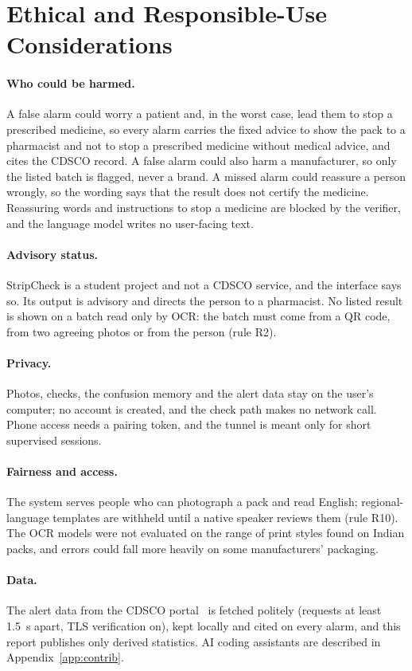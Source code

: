 \section{Ethical and Responsible-Use Considerations}
\label{sec:lim-ethical-and-responsible-use-considerations}

\paragraph{Who could be harmed.} A false alarm could worry a patient and, in the worst case, lead them to stop a prescribed medicine, so every alarm carries the fixed advice to show the pack to a pharmacist and not to stop a prescribed medicine without medical advice, and cites the CDSCO record. A false alarm could also harm a manufacturer, so only the listed batch is flagged, never a brand. A missed alarm could reassure a person wrongly, so the \NLISTED{} wording says that the result does not certify the medicine. Reassuring words and instructions to stop a medicine are blocked by the verifier, and the language model writes no user-facing text.

\paragraph{Advisory status.} StripCheck is a student project and not a CDSCO service, and the interface says so. Its output is advisory and directs the person to a pharmacist. No listed result is shown on a batch read only by OCR: the batch must come from a QR code, from two agreeing photos or from the person (rule R2).

\paragraph{Privacy.} Photos, checks, the confusion memory and the alert data stay on the user's computer; no account is created, and the check path makes no network call. Phone access needs a pairing token, and the tunnel is meant only for short supervised sessions.

\paragraph{Fairness and access.} The system serves people who can photograph a pack and read English; regional-language templates are withheld until a native speaker reviews them (rule R10). The OCR models were not evaluated on the range of print styles found on Indian packs, and errors could fall more heavily on some manufacturers' packaging.

\paragraph{Data.} The alert data from the CDSCO portal~\cite{cdsco2026portal} is fetched politely (requests at least 1.5~s apart, TLS verification on), kept locally and cited on every alarm, and this report publishes only derived statistics. AI coding assistants are described in Appendix~\ref{app:contrib}.
